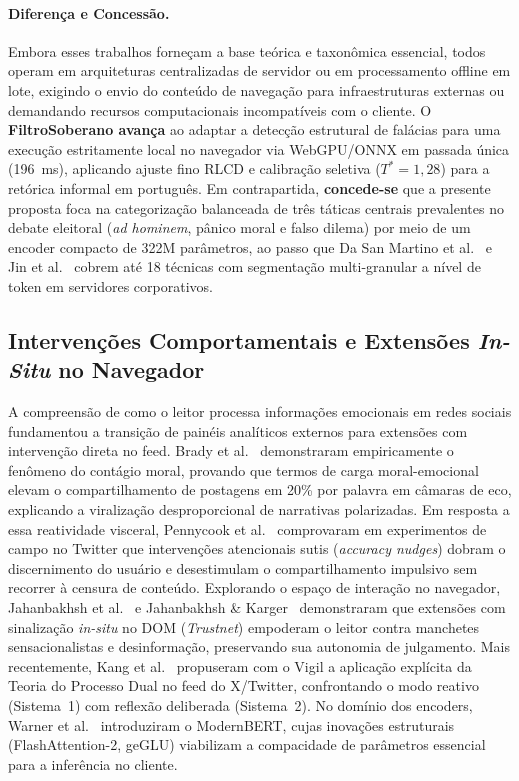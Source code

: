 \documentclass[runningheads]{llncs}
\begin{document}
\paragraph{Diferença e Concessão.} Embora esses trabalhos forneçam a base teórica e taxonômica essencial, todos operam em arquiteturas centralizadas de servidor ou em processamento offline em lote, exigindo o envio do conteúdo de navegação para infraestruturas externas ou demandando recursos computacionais incompatíveis com o cliente. O \textbf{FiltroSoberano avança} ao adaptar a detecção estrutural de falácias para uma execução estritamente local no navegador via WebGPU/ONNX em passada única (196~ms), aplicando ajuste fino RLCD e calibração seletiva ($T^*=1{,}28$) para a retórica informal em português. Em contrapartida, \textbf{concede-se} que a presente proposta foca na categorização balanceada de três táticas centrais prevalentes no debate eleitoral (\textit{ad hominem}, pânico moral e falso dilema) por meio de um encoder compacto de 322M parâmetros, ao passo que Da San Martino et al.~\cite{dasanmartino2019fine} e Jin et al.~\cite{jin2022logical} cobrem até 18 técnicas com segmentação multi-granular a nível de token em servidores corporativos.

\subsection{Intervenções Comportamentais e Extensões \textit{In-Situ} no Navegador}

A compreensão de como o leitor processa informações emocionais em redes sociais fundamentou a transição de painéis analíticos externos para extensões com intervenção direta no feed. Brady et al.~\cite{brady2017emotion} demonstraram empiricamente o fenômeno do contágio moral, provando que termos de carga moral-emocional elevam o compartilhamento de postagens em 20\% por palavra em câmaras de eco, explicando a viralização desproporcional de narrativas polarizadas. Em resposta a essa reatividade visceral, Pennycook et al.~\cite{pennycook2021shifting} comprovaram em experimentos de campo no Twitter que intervenções atencionais sutis (\textit{accuracy nudges}) dobram o discernimento do usuário e desestimulam o compartilhamento impulsivo sem recorrer à censura de conteúdo. Explorando o espaço de interação no navegador, Jahanbakhsh et al.~\cite{jahanbakhsh2022our} e Jahanbakhsh \& Karger~\cite{jahanbakhsh2024browser} demonstraram que extensões com sinalização \textit{in-situ} no DOM (\textit{Trustnet}) empoderam o leitor contra manchetes sensacionalistas e desinformação, preservando sua autonomia de julgamento. Mais recentemente, Kang et al.~\cite{kang2026vigil} propuseram com o Vigil a aplicação explícita da Teoria do Processo Dual no feed do X/Twitter, confrontando o modo reativo (Sistema~1) com reflexão deliberada (Sistema~2). No domínio dos encoders, Warner et al.~\cite{warner2025smarter} introduziram o ModernBERT, cujas inovações estruturais (FlashAttention-2, geGLU) viabilizam a compacidade de parâmetros essencial para a inferência no cliente.
\end{document}
